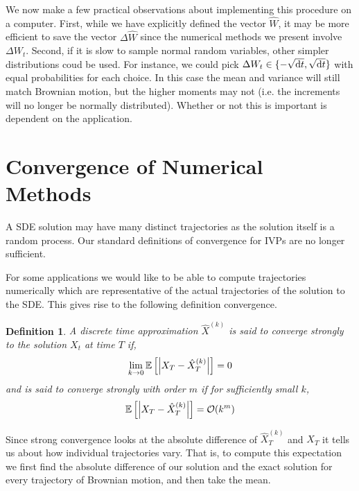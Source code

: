 \documentclass[12pt]{article}
\newtheorem*{definition}{Definition}
\begin{document}
We now make a few practical observations about implementing this procedure on a computer. First, while we have explicitly defined the vector \( \hat{W} \), it may be more efficient to save the vector \( \Delta \hat{W} \) since the numerical methods we present involve \( \Delta W_t \). Second, if it is slow to sample normal random variables, other simpler distributions coud be used. For instance, we could pick \( \Delta W_t \in\{-\sqrt{\mathrm{d} t}, \sqrt{\mathrm{d} t}\} \) with equal probabilities for each choice. In this case the mean and variance will still match Brownian motion, but the higher moments may not (i.e. the increments will no longer be normally distributed). Whether or not this is important is dependent on the application.


\section{Convergence of Numerical Methods}
A SDE solution may have many distinct trajectories as the solution itself is a random process. Our standard definitions of convergence for IVPs are no longer sufficient.

For some applications we would like to be able to compute trajectories numerically which are representative of the actual trajectories of the solution to the SDE. This gives rise to the following definition convergence.
\begin{definition}
A discrete time approximation \( \hat{X}^{(k)} \) is said to converge strongly to the solution \( X_t \) at time \( T \) if,
\begin{align*}
    \lim_{k\to 0}\mathbb{E}\left[\left| X_T - \hat{X}_T^{(k)} \right|\right] = 0
\end{align*}
and is said to converge strongly with order \( m \) if for sufficiently small \( k \),
\begin{align*}
    \mathbb{E}\left[\left| X_T - \hat{X}_T^{(k)} \right|\right] = \mathcal{O}(k^m)
\end{align*}
\end{definition}

Since strong convergence looks at the absolute difference of \( \hat{X}_T^{(k)} \) and \( X_T \) it tells us about how individual trajectories vary. That is, to compute this expectation we first find the absolute difference of our solution and the exact solution for every trajectory of Brownian motion, and then take the mean.
\end{document}
